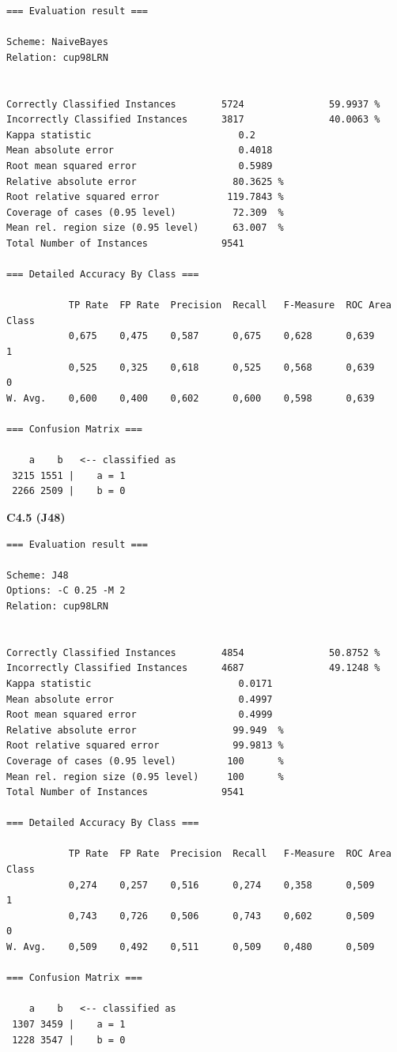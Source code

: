 \begin{verbatim}
=== Evaluation result ===

Scheme: NaiveBayes
Relation: cup98LRN


Correctly Classified Instances        5724               59.9937 %
Incorrectly Classified Instances      3817               40.0063 %
Kappa statistic                          0.2   
Mean absolute error                      0.4018
Root mean squared error                  0.5989
Relative absolute error                 80.3625 %
Root relative squared error            119.7843 %
Coverage of cases (0.95 level)          72.309  %
Mean rel. region size (0.95 level)      63.007  %
Total Number of Instances             9541     

=== Detailed Accuracy By Class ===

           TP Rate  FP Rate  Precision  Recall   F-Measure  ROC Area  Class
           0,675    0,475    0,587      0,675    0,628      0,639     1
           0,525    0,325    0,618      0,525    0,568      0,639     0
W. Avg.    0,600    0,400    0,602      0,600    0,598      0,639     

=== Confusion Matrix ===

    a    b   <-- classified as
 3215 1551 |    a = 1
 2266 2509 |    b = 0
\end{verbatim}

\textbf{\Large C4.5 (J48)}

\begin{verbatim}
=== Evaluation result ===

Scheme: J48
Options: -C 0.25 -M 2
Relation: cup98LRN


Correctly Classified Instances        4854               50.8752 %
Incorrectly Classified Instances      4687               49.1248 %
Kappa statistic                          0.0171
Mean absolute error                      0.4997
Root mean squared error                  0.4999
Relative absolute error                 99.949  %
Root relative squared error             99.9813 %
Coverage of cases (0.95 level)         100      %
Mean rel. region size (0.95 level)     100      %
Total Number of Instances             9541     

=== Detailed Accuracy By Class ===

           TP Rate  FP Rate  Precision  Recall   F-Measure  ROC Area  Class
           0,274    0,257    0,516      0,274    0,358      0,509     1
           0,743    0,726    0,506      0,743    0,602      0,509     0
W. Avg.    0,509    0,492    0,511      0,509    0,480      0,509     

=== Confusion Matrix ===

    a    b   <-- classified as
 1307 3459 |    a = 1
 1228 3547 |    b = 0
\end{verbatim}


